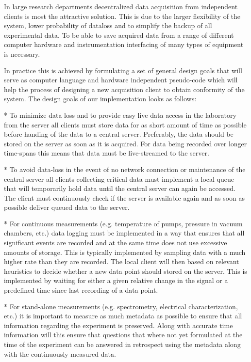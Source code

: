 In large research departments decentralized data acquisition from independent
clients is most the attractive solution. This is due to the larger flexibility
of the system, lower probability of dataloss and to simplify the backup of all
experimental data. To be able to save acquired data from a range of different
computer hardware and instrumentation interfacing of many types of equipment is
necessary.

In practice this is achieved by formulating a set of general design goals that
will serve as computer language and hardware independent pseudo-code which will
help the process of designing a new acquisition client to obtain conformity of
the system. The design goals of our implementation looks as follows:

* To minimize data loss and to provide easy live data access in the laboratory
  from the server all clients must store data for as short amount of time as
  possible before handing of the data to a central server. Preferably, the data
  should be stored on the server as soon as it is acquired. For data being
  recorded over longer time-spans this means that data must be live-streamed to
  the server.

* To avoid data-loss in the event of no network connection or maintenance
  of the central server all clients collecting critical data must implement a
  local queue that will temporarily hold data until the central server can
  again be accessed. The client must continuously check if the server is
  available again and as soon as possible deliver queued data to the server.

* For continuous measurements (e.g. temperature of pumps, pressure in vacuum
  chambers, etc.) data logging must be implemented in a way that ensures that
  all significant events are recorded and at the same time does not use
  excessive amounts of storage. This is typically implemented by sampling data
  with a much higher rate than they are recorded. The local client will then
  based on relevant heuristics to decide whether a new data point should stored on
  the server. This is implemented by waiting for either a given relative change
  in the signal or a predefined time since last recording of a data point.
  
* For stand-alone measurements (e.g. spectrometry, electrical characterization,
  etc.) it is important to measure as much metadata as possible to ensure
  that all information regarding the experiment is preserved. Along with
  accurate time information will this ensure that questions that where not yet
  formulated at the time of the experiment can be answered in retrospect using
  the metadata along with the continuously measured data.
  

